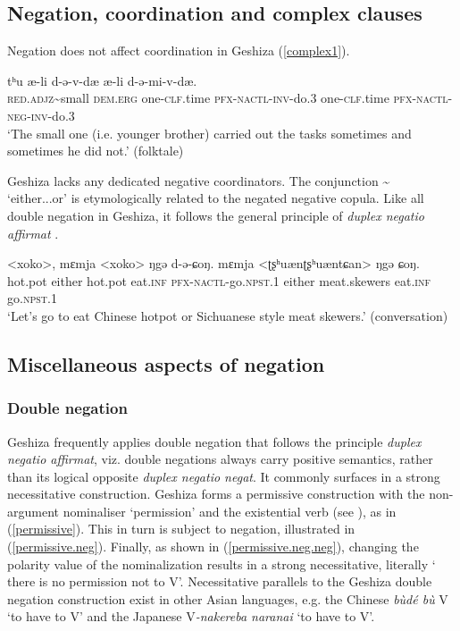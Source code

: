 \documentclass[output=paper,colorlinks,citecolor=brown]{langscibook}
\begin{document}
\subsection{Negation, coordination and complex clauses}
Negation does not affect coordination in Geshiza (\ref{complex1}).

\ea
\label{complex1}
 {tʰu} {æ-li} {d-ə-v-dæ} {æ-li} {d-ə-mi-v-dæ.} \\
	\textsc{red.adjz}\textasciitilde small \textsc{dem.erg}
	one-\textsc{clf}.time \textsc{pfx}-\textsc{nactl-inv}-do.3
	one-\textsc{clf}.time 
	\textsc{pfx}-\textsc{nactl-neg-inv}-do.3
	\\
\glt `The small one (i.e. younger brother) carried out the tasks sometimes and sometimes he did not.' (folktale)
\z

Geshiza lacks any dedicated negative coordinators. The conjunction  \textasciitilde \  `either...or' is etymologically related to the negated negative copula. Like all double negation in Geshiza, it follows the general principle of \textit{duplex negatio affirmat} .

\ea
\label{complex2}
\gll  <{xoko}>, 	{mɛmja} 	<{xoko}> 	{ŋgə}			{d-ə-ɕoŋ}. {mɛmja} 	<{ʈʂʰuænʈʂʰuæntɕan}> 	{ŋgə}	{ɕoŋ}.\\
hot.pot		either		hot.pot		eat.\textsc{inf} \textsc{pfx-nactl}-go.\textsc{npst}.1
either		meat.skewers					eat.\textsc{inf} go.\textsc{npst}.1\\
\glt `Let’s go to eat Chinese hotpot or Sichuanese style meat skewers.' (conversation)
\z

\subsection{Miscellaneous aspects of negation}
\label{otheraspects}
\subsubsection{Double negation}
\label{double}
Geshiza frequently applies double negation that follows the principle \textit{duplex negatio affirmat}, viz. double negations always carry positive semantics, rather than its logical opposite \textit{duplex negatio negat}. It commonly surfaces in a strong necessitative construction. Geshiza forms a permissive construction with the non-argument nominaliser  ‘permission’ and the existential verb  (see ), as in (\ref{permissive}). This in turn is subject to negation, illustrated in (\ref{permissive.neg}). Finally, as shown in (\ref{permissive.neg.neg}), changing the polarity value of the nominalization results in a strong necessitative, literally `
there is no permission not to V'. Necessitative parallels to the Geshiza double negation construction exist in other Asian languages, e.g. the Chinese \textit{bùdé bù} V `to have to V' and the Japanese V\textit{-nakereba naranai} `to have to V'.
\end{document}
